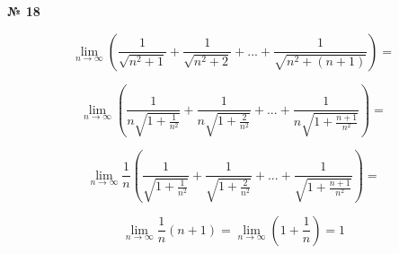 \documentclass{article}
\begin{document}
\textbf{№ 18} 


$$ \lim_{n\to\infty} \left(\frac{1}{\sqrt{n^2+1}} + \frac{1}{\sqrt{n^2+2}} + ... + \frac{1}{\sqrt{n^2+(n+1)}}\right) = $$

$$ \lim_{n\to\infty} \left(\frac{1}{n\sqrt{1+\frac{1}{n^2}}} + \frac{1}{n\sqrt{1+\frac{2}{n^2}}} + ... + \frac{1}{n\sqrt{1+\frac{n+1}{n^2}}}\right) = $$

$$ \lim_{n\to\infty} \frac{1}{n}\left(\frac{1}{\sqrt{1+\frac{1}{n^2}}} + \frac{1}{\sqrt{1+\frac{2}{n^2}}} + ... + \frac{1}{\sqrt{1+\frac{n+1}{n^2}}}\right) = $$

$$ \lim_{n\to\infty} \frac{1}{n}(n+1) 
= \lim_{n\to\infty} \left(1 + \frac{1}{n}\right)
= 1 $$
\end{document}
